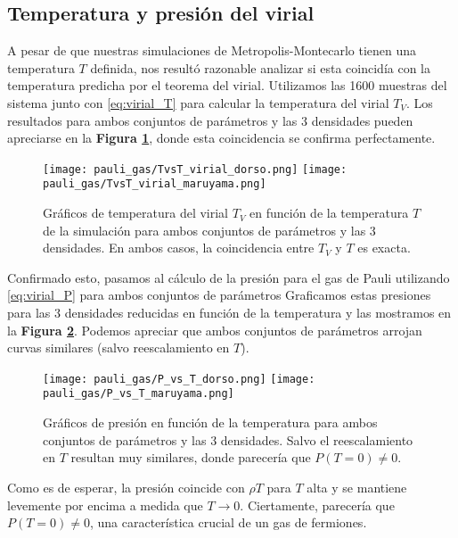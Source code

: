\newpage

\subsection{Temperatura y presión del virial}

A pesar de que nuestras simulaciones de Metropolis-Montecarlo tienen una temperatura $T$ definida, nos resultó razonable analizar si esta coincidía con la temperatura predicha por el teorema del virial.
Utilizamos las 1600 muestras del sistema junto con \eqref{eq:virial_T} para calcular la temperatura del virial $T_V$.
Los resultados para ambos conjuntos de parámetros y las 3 densidades pueden apreciarse en la \textbf{Figura \ref{fig:TvsT_sim}}, donde esta coincidencia se confirma perfectamente.

\begin{figure}[H]
	\centering	%
	\texttt{[image: pauli\_gas/TvsT\_virial\_dorso.png]}
	\texttt{[image: pauli\_gas/TvsT\_virial\_maruyama.png]}
	\caption{Gráficos de temperatura del virial $T_V$ en función de la temperatura $T$ de la simulación para ambos conjuntos de parámetros y las 3 densidades.
	En ambos casos, la coincidencia entre $T_V$ y $T$ es exacta.}
	\label{fig:TvsT_sim}
\end{figure}

Confirmado esto, pasamos al cálculo de la presión para el gas de Pauli utilizando \eqref{eq:virial_P} para ambos conjuntos de parámetros
Graficamos estas presiones para las 3 densidades reducidas en función de la temperatura y las mostramos en la \textbf{Figura \ref{fig:PvsT_sim}}.
Podemos apreciar que ambos conjuntos de parámetros arrojan curvas similares (salvo reescalamiento en $T$).

\begin{figure}[H]
	\centering	%
	\texttt{[image: pauli\_gas/P\_vs\_T\_dorso.png]}
	\texttt{[image: pauli\_gas/P\_vs\_T\_maruyama.png]}
	\caption{Gráficos de presión en función de la temperatura para ambos conjuntos de parámetros y las 3 densidades.
	  Salvo el reescalamiento en $T$ resultan muy similares, donde parecería que $P(T=0)\neq0$.}
	\label{fig:PvsT_sim}
\end{figure}

Como es de esperar, la presión coincide con $\rho T$ para $T$ alta y se mantiene levemente por encima a medida que $T\to0$.
Ciertamente, parecería que $P(T=0)\neq0$, una característica crucial de un gas de fermiones.
